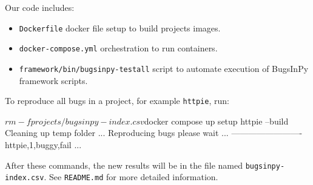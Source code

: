 \documentclass[conference]{IEEEtran}
\begin{document}
Our code includes:
\begin{itemize}
  \item \texttt{Dockerfile} docker file setup to build projects images.
  \item \texttt{docker-compose.yml} orchestration to run containers.
  \item \texttt{framework/bin/bugsinpy-testall} script to automate execution of BugsInPy framework scripts.
\end{itemize}

To reproduce all bugs in a project, for example \texttt{httpie}, run:

\begin{verbatim*}
$rm -f projects/bugsinpy-index.csv
$docker compose up setup httpie --build
Cleaning up temp folder ...
Reproducing bugs please wait ...
-------------------------
httpie,1,buggy,fail
...
\end{verbatim*}

After these commands, the new results will be in the file named \texttt{bugsinpy-index.csv}.
See \texttt{README.md} for more detailed information.
\end{document}
